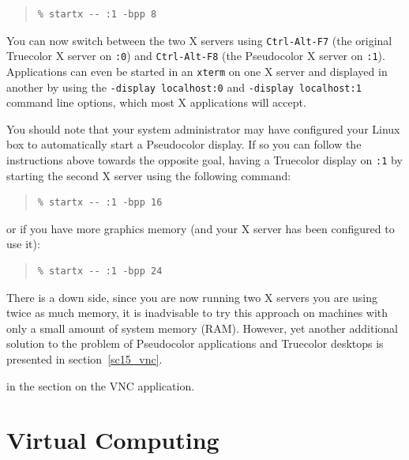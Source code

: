 \documentclass[twoside,11pt]{article}
\newcommand{\htmlref}[2]{#1}
\newcommand{\latex}[1]{#1}
\newcommand{\xlabel}[1]{}
\begin{document}
\small
\begin{quote}
\begin{verbatim}
% startx -- :1 -bpp 8
\end{verbatim}
\end{quote}
\normalsize

You can now switch between the two X servers using {\tt Ctrl-Alt-F7} (the original Truecolor X server on {\tt :0}) and {\tt Ctrl-Alt-F8} (the Pseudocolor X server on {\tt :1}). Applications can even be started in an {\tt xterm} on one X server and  displayed in another by using the {\tt -display localhost:0} and {\tt -display localhost:1} command line options, which most X applications will accept.

You should note that your system administrator may have configured your Linux box to automatically start a Pseudocolor display. If so you can follow the instructions above towards the opposite goal, having a Truecolor display on {\tt :1} by starting the second X server using the following command:

\small
\begin{quote}
\begin{verbatim}
% startx -- :1 -bpp 16
\end{verbatim}
\end{quote}
\normalsize

or if you have more graphics memory (and your X server has been configured to use it):

\small
\begin{quote}
\begin{verbatim}
% startx -- :1 -bpp 24
\end{verbatim}
\end{quote}
\normalsize

There is a down side, since you are now running two X servers you are using twice as much memory, it is inadvisable to try this approach on machines with only a small amount of system memory (RAM). However, yet another additional solution to the problem of Pseudocolor applications and Truecolor desktops is presented\latex{ in section~\ref{sc15_vnc}.}
\begin{htmlonly}
in the section on the \htmlref{VNC}{sc15_vnc} application.
\end{htmlonly}

\section{\xlabel{sc15_virtual}Virtual Computing\label{sc15_virtual}}
\end{document}
